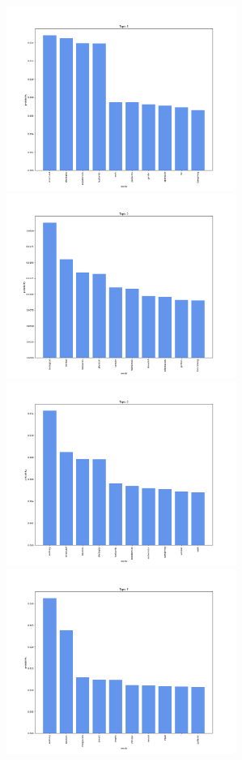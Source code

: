 \documentclass[10pt]{article} %
\begin{document}
\begin{center}
		\includegraphics[width=7.5cm]{images/plots/test_5_no_stopwords/topic_4.png}
		\includegraphics[width=7.5cm]{images/plots/test_5_no_stopwords/topic_5.png}
		\includegraphics[width=7.5cm]{images/plots/test_5_no_stopwords/topic_6.png}
		\includegraphics[width=7.5cm]{images/plots/test_5_no_stopwords/topic_7.png}
	\end{center}
	
\end{document}

